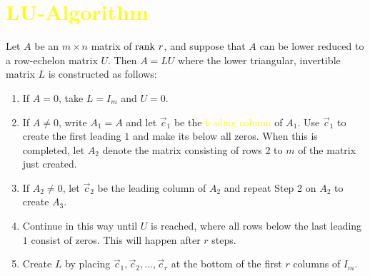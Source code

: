 \documentclass[pdf,9pt]{beamer}
\begin{document}
\section[\textcolor{yellow}{}]{\textcolor{yellow}{LU-Algorithm}}
\begin{frame}[fragile]
\begin{theorem}[ LU-Algorithm ] %
Let $A$ be an $m \times n$ matrix of $\mbox{rank }r$, and suppose that $A$ can
be lower reduced to a row-echelon matrix $U$. Then $A = LU$ where the lower
triangular, invertible matrix $L$ is constructed as
follows:

\begin{enumerate}
\item If $A = 0$, take $L = I_{m}$ and $U = 0$.
\item If $A \neq 0$, write $A_{1} = A$ and let $\vec{c}_{1}$ be the
    \textcolor{yellow}{leading column} of $A_{1}$. Use $\vec{c}_{1}$ to create
    the first leading $1$ and make its below all zeros. When this is completed,
    let $A_{2}$ denote the matrix consisting of rows 2 to $m$ of the matrix
    just created.
\item If $A_{2} \neq 0$, let $\vec{c}_{2}$ be the leading column of $A_{2}$ and
    repeat Step 2 on $A_{2}$ to create $A_{3}$.
\item Continue in this way until $U$ is reached, where all rows below the last
    leading $1$ consist of zeros. This will happen after $r$ steps.
\item Create $L$ by placing $\vec{c}_{1}, \vec{c}_{2}, \dots, \vec{c}_{r}$ at
    the bottom of the first $r$ columns of $I_{m}$.
\end{enumerate}
\end{theorem} %
\end{frame}
\end{document}
